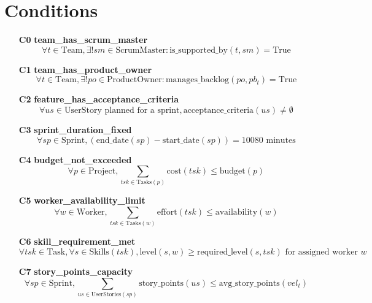\documentclass[11pt]{article}
\begin{document}
\section{Conditions}
\begin{itemize}
    \item[\textbf{C0}] \textbf{team\_has\_scrum\_master}
        \[
        \forall t \in \text{Team}, \exists! sm \in \text{ScrumMaster} : \text{is\_supported\_by}(t, sm) = \text{True}
        \]
        
    \item[\textbf{C1}] \textbf{team\_has\_product\_owner}
        \[
        \forall t \in \text{Team}, \exists! po \in \text{ProductOwner} : \text{manages\_backlog}(po, pb_t) = \text{True}
        \]
        
    \item[\textbf{C2}] \textbf{feature\_has\_acceptance\_criteria}
        \[
        \forall us \in \text{UserStory} \text{ planned for a sprint}, \text{acceptance\_criteria}(us) \neq \emptyset
        \]
        
    \item[\textbf{C3}] \textbf{sprint\_duration\_fixed}
        \[
        \forall sp \in \text{Sprint}, (\text{end\_date}(sp) - \text{start\_date}(sp)) = 10080 \text{ minutes}
        \]
        
    \item[\textbf{C4}] \textbf{budget\_not\_exceeded}
        \[
        \forall p \in \text{Project}, \sum_{tsk \in \text{Tasks}(p)} \text{cost}(tsk) \leq \text{budget}(p)
        \]
        
    \item[\textbf{C5}] \textbf{worker\_availability\_limit}
        \[
        \forall w \in \text{Worker}, \sum_{tsk \in \text{Tasks}(w)} \text{effort}(tsk) \leq \text{availability}(w)
        \]
        
    \item[\textbf{C6}] \textbf{skill\_requirement\_met}
        \[
        \forall tsk \in \text{Task}, \forall s \in \text{Skills}(tsk), \text{level}(s, w) \geq \text{required\_level}(s, tsk) \text{ for assigned worker } w
        \]
        
    \item[\textbf{C7}] \textbf{story\_points\_capacity}
        \[
        \forall sp \in \text{Sprint}, \sum_{us \in \text{UserStories}(sp)} \text{story\_points}(us) \leq \text{avg\_story\_points}(vel_t)
        \]
\end{itemize}
\end{document}
